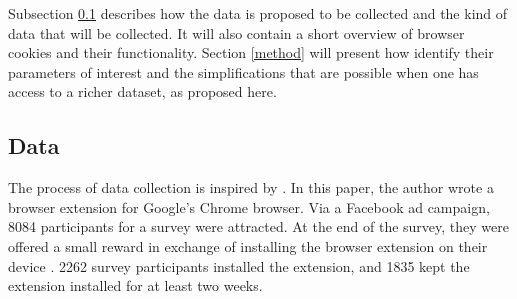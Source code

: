 Subsection \ref{data coll} describes how the data is proposed to be collected and the kind of data that will be collected.
It will also contain a short overview of
browser cookies and their functionality. Section \ref{method} will present how
\textcite{goldin2020} identify their parameters of interest and the simplifications
that are possible when one has access to a richer dataset, as proposed here.

\subsection{Data} \label{data coll}
The process of data collection is inspired by \textcite{levy2020}. In this paper, the
author wrote a browser extension for Google's Chrome browser. Via a Facebook ad campaign,
8084 participants for a survey were attracted. At the end of the survey, they were offered a
small reward in exchange of installing the browser extension on their device \parencite[p. 9]{levy2020}.
2262 survey participants installed the extension, and 1835 kept the extension installed for at least two weeks.

